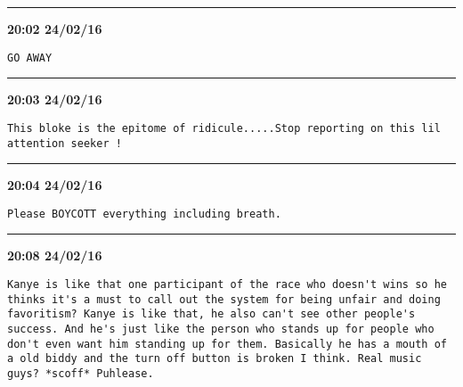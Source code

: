 \hrule%

\begin{adjustwidth}{0cm}{0cm}
\footnotesize \textbf{20:02 24/02/16}

\begin{lstlisting}[breaklines, breakatwhitespace, basicstyle=\small, frame=leftline]
GO AWAY
\end{lstlisting}
\end{adjustwidth}

\hrule%

\begin{adjustwidth}{0cm}{0cm}
\footnotesize \textbf{20:03 24/02/16}

\begin{lstlisting}[breaklines, breakatwhitespace, basicstyle=\small, frame=leftline]
This bloke is the epitome of ridicule.....Stop reporting on this lil attention seeker !
\end{lstlisting}
\end{adjustwidth}

\hrule%

\begin{adjustwidth}{0cm}{0cm}
\footnotesize \textbf{20:04 24/02/16}

\begin{lstlisting}[breaklines, breakatwhitespace, basicstyle=\small, frame=leftline]
Please BOYCOTT everything including breath.
\end{lstlisting}
\end{adjustwidth}

\hrule%

\begin{adjustwidth}{0cm}{0cm}
\footnotesize \textbf{20:08 24/02/16}

\begin{lstlisting}[breaklines, breakatwhitespace, basicstyle=\small, frame=leftline]
Kanye is like that one participant of the race who doesn't wins so he thinks it's a must to call out the system for being unfair and doing favoritism? Kanye is like that, he also can't see other people's success. And he's just like the person who stands up for people who don't even want him standing up for them. Basically he has a mouth of a old biddy and the turn off button is broken I think. Real music guys? *scoff* Puhlease.
\end{lstlisting}
\end{adjustwidth}

